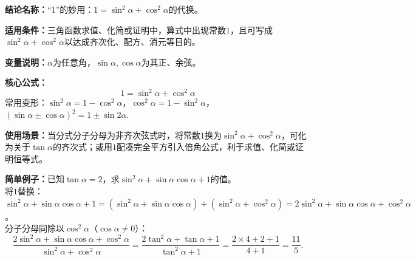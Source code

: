 \textbf{结论名称：}“1”的妙用：$1=\sin^2\alpha+\cos^2\alpha$的代换。

\textbf{适用条件：}三角函数求值、化简或证明中，算式中出现常数$1$，且可写成$\sin^2\alpha+\cos^2\alpha$以达成齐次化、配方、消元等目的。

\textbf{变量说明：}$\alpha$为任意角，$\sin\alpha,\cos\alpha$为其正、余弦。

\textbf{核心公式：}\[\boxed{1=\sin^2\alpha+\cos^2\alpha}\]常用变形：$\sin^2\alpha=1-\cos^2\alpha$，$\cos^2\alpha=1-\sin^2\alpha$，$(\sin\alpha\pm\cos\alpha)^2=1\pm\sin2\alpha$.

\textbf{使用场景：}当分式分子分母为非齐次弦式时，将常数$1$换为$\sin^2\alpha+\cos^2\alpha$，可化为关于$\tan\alpha$的齐次式；或用$1$配凑完全平方引入倍角公式，利于求值、化简或证明恒等式。

\textbf{简单例子：}已知$\tan\alpha=2$，求$\sin^2\alpha+\sin\alpha\cos\alpha+1$的值。\\
将$1$替换：$\sin^2\alpha+\sin\alpha\cos\alpha+1=(\sin^2\alpha+\sin\alpha\cos\alpha)+(\sin^2\alpha+\cos^2\alpha)=2\sin^2\alpha+\sin\alpha\cos\alpha+\cos^2\alpha$。\\
分子分母同除以$\cos^2\alpha$（$\cos\alpha\neq0$）：
\[
\frac{2\sin^2\alpha+\sin\alpha\cos\alpha+\cos^2\alpha}{\sin^2\alpha+\cos^2\alpha}=\frac{2\tan^2\alpha+\tan\alpha+1}{\tan^2\alpha+1}=\frac{2\times4+2+1}{4+1}=\frac{11}{5}.
\]